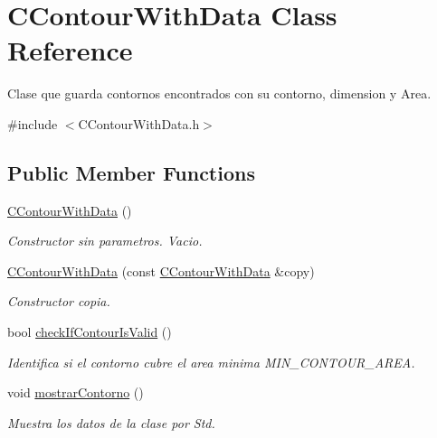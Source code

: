 \hypertarget{classCContourWithData}{}\section{C\+Contour\+With\+Data Class Reference}
\label{classCContourWithData}


Clase que guarda contornos encontrados con su contorno, dimension y Area.  




{\ttfamily \#include $<$C\+Contour\+With\+Data.\+h$>$}

\subsection*{Public Member Functions}
\begin{DoxyCompactItemize}
\item 
\hyperlink{classCContourWithData_a209af0add40f7b312b5bf72c7e9d47b7}{C\+Contour\+With\+Data} ()
\begin{DoxyCompactList}\small\item\em Constructor sin parametros. Vacio. \end{DoxyCompactList}\item 
\hyperlink{classCContourWithData_a756d63b5e03e8809531f13c3231a5c3b}{C\+Contour\+With\+Data} (const \hyperlink{classCContourWithData}{C\+Contour\+With\+Data} \&copy)
\begin{DoxyCompactList}\small\item\em Constructor copia. \end{DoxyCompactList}\item 
bool \hyperlink{classCContourWithData_aee393fc1557ce93c93fa16cba9a0f457}{check\+If\+Contour\+Is\+Valid} ()
\begin{DoxyCompactList}\small\item\em Identifica si el contorno cubre el area minima M\+I\+N\+\_\+\+C\+O\+N\+T\+O\+U\+R\+\_\+\+A\+R\+EA. \end{DoxyCompactList}\item 
void \hyperlink{classCContourWithData_adc8d62ef51d181ee9bf36b250dc14990}{mostrar\+Contorno} ()
\begin{DoxyCompactList}\small\item\em Muestra los datos de la clase por Std. \end{DoxyCompactList}\end{DoxyCompactItemize}
